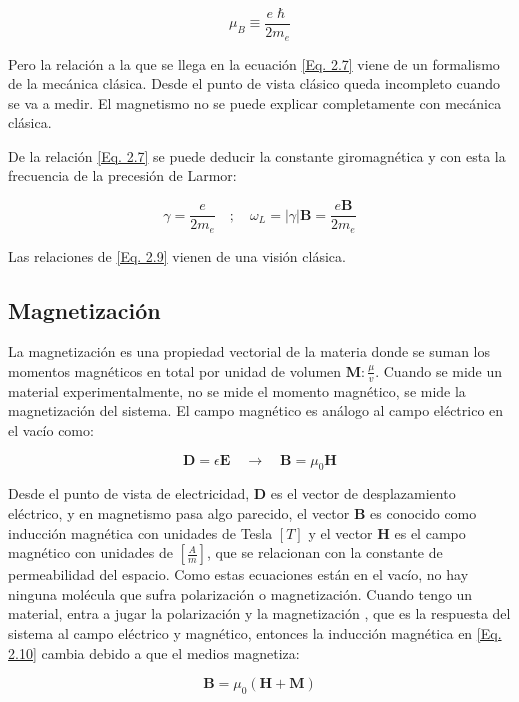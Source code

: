 \documentclass[11pt,fleqn]{book}
\renewcommand{\vec}[1]{\mathbf{#1}}
\begin{document}
\begin{equation}
    \mu_{B}\equiv\frac{e\hslash}{2m_{e}}
\label{Eq. 2.8}
\end{equation}

Pero la relación a la que se llega en la ecuación \ref{Eq. 2.7} viene de un formalismo de la mecánica clásica. Desde el punto de vista clásico queda incompleto cuando se va a medir. El magnetismo no se puede explicar completamente con mecánica clásica.

De la relación \ref{Eq. 2.7} se puede deducir la constante giromagnética y con esta la frecuencia de la precesión de Larmor: 

\begin{equation}
    \gamma=\frac{e}{2m_{e}} \quad ;\quad \omega_{L}=|\gamma|\vec{B}=\frac{e\vec{B}}{2m_{e}}
    \label{Eq. 2.9}
\end{equation}

Las relaciones de \ref{Eq. 2.9} vienen de una visión clásica.

\subsection{Magnetización}
La magnetización es una propiedad vectorial de la materia donde se suman los momentos magnéticos en total por unidad de volumen $\vec{M}:\frac{\mu}{v}$. Cuando se mide un material experimentalmente, no se mide el momento magnético, se mide la magnetización del sistema. El campo magnético es análogo al campo eléctrico en el vacío como:

\begin{equation}
    \vec{D}=\epsilon\vec{E}\quad\longrightarrow\quad\vec{B}=\mu_{0}\vec{H}
    \label{Eq. 2.10}
\end{equation}

Desde el punto de vista de electricidad, $\vec{D}$ es el vector de desplazamiento eléctrico, y en magnetismo pasa algo parecido, el vector $\vec{B}$ es conocido como inducción magnética con unidades de Tesla $[T]$ y el vector $\vec{H}$ es el campo magnético con unidades de $[\frac{A}{m}]$, que se relacionan con la constante de permeabilidad del espacio. Como estas ecuaciones están en el vacío, no hay ninguna molécula que sufra polarización o magnetización. Cuando tengo un material, entra a jugar la polarización y la magnetización , que es la respuesta del sistema al campo eléctrico y magnético, entonces la inducción magnética en \ref{Eq. 2.10} cambia debido a que el medios magnetiza:

\begin{equation}
    \vec{B}=\mu_{0}(\vec{H}+\vec{M})
    \label{Eq. 2.11}
\end{equation}
\end{document}
